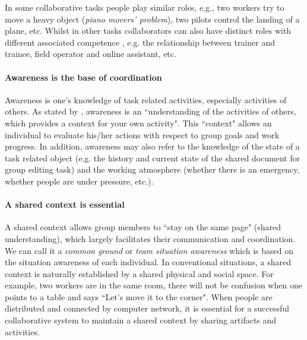 In some collaborative tasks people play similar roles, e.g., two workers try to move a heavy object (\textit{piano movers' problem}), two pilots control the landing of a plane, etc. Whilst in other tasks collaborators can also have distinct roles with different associated competence \citep{Pouliquen2014Role}, e.g. the relationship between trainer and trainee, field operator and online assistant, etc.

\paragraph{Awareness is the base of coordination} Awareness is one's knowledge of task related activities, especially activities of others. As stated by \citet{Dourish1992Awareness}, awareness is an ``understanding of the activities of others, which provides a context for your own activity". This ``context" allows an individual to evaluate his/her actions with respect to group goals and work progress. In addition, awareness may also refer to the knowledge of the state of a task related object (e.g. the history and current state of the shared document for group editing task) and the working atmosphere (whether there is an emergency, whether people are under pressure, etc.).


\paragraph{A shared context is essential} A shared context allows group members to ``stay on the same page" (shared understanding), which largely facilitates their communication and coordination. We can call it a \textit{common ground} \citep{Clark1991Grounding} or \textit{team situation awareness} \citep{Salas1995SA} which is based on the situation awareness of each individual. In conventional situations, a shared context is naturally established by a shared physical and social space. For example, two workers are in the same room, there will not be confusion when one points to a table and says ``Let's move it to the corner". When people are distributed and connected by computer network, it is essential for a successful collaborative system to maintain a shared context by sharing artifacts and activities.

